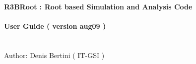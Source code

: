 \begin{titlepage}
\begin{center}
\noindent {\large \textbf{ }} \\
\vspace*{0.3cm}
\noindent {\LARGE \textbf{ }} \\
\noindent \textbf{ } \\
\vspace*{0.5cm}
\noindent \Huge \textbf{R3BRoot : Root based Simulation and Analysis Code } \\
\vspace*{0.3cm}
\noindent \large {  } \\
\vspace*{0.3cm}
\noindent \LARGE \textbf{ User Guide ( version aug09 )} \\
\vspace*{0.3cm}
\noindent \Large  \\
\noindent \Large  \\
\vspace*{0.4cm}
\noindent \large { Author: Denis Bertini ( IT-GSI ) }
\noindent \LARGE   \\
\vspace*{0.8cm}
\noindent {\Huge \textbf{  }} \\
\vspace*{0.8cm}
\noindent \Large  \\
\vspace*{0.2cm}
\noindent \Large  \\
\vspace*{0.2cm}
\noindent \large  \\
\vspace*{0.5cm}
\end{center}
\noindent \large  \\
\begin{center}
\noindent \large 
\end{center}
\end{titlepage}
\sloppy

\titlepage
